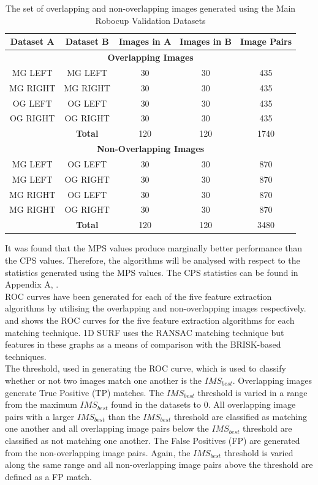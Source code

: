 \documentclass[11pt]{report}
\begin{document}
\begin{table}
\centering
\caption{The set of overlapping and non-overlapping images generated using
the Main Robocup Validation Datasets}
\begin{tabular}{|c|c|c|c|c|}
\hline 
\textbf{Dataset A} & \textbf{Dataset B} & \textbf{Images in A} & \textbf{Images in B} & \textbf{Image Pairs}\tabularnewline
\hline 
\hline 
\multicolumn{5}{|c|}{\textbf{Overlapping Images}}\tabularnewline
\hline 
MG LEFT & MG LEFT & 30 & 30 & 435\tabularnewline
\hline 
MG RIGHT & MG RIGHT & 30 & 30 & 435\tabularnewline
\hline 
OG LEFT & OG LEFT & 30 & 30 & 435\tabularnewline
\hline 
OG RIGHT & OG RIGHT & 30 & 30 & 435\tabularnewline
\hline 
 & \textbf{Total} & 120 & 120 & 1740\tabularnewline
\hline 
\multicolumn{5}{|c|}{\textbf{Non-Overlapping Images}}\tabularnewline
\hline 
MG LEFT & OG LEFT & 30 & 30 & 870\tabularnewline
\hline 
MG LEFT & OG RIGHT & 30 & 30 & 870\tabularnewline
\hline 
MG RIGHT & OG LEFT & 30 & 30 & 870\tabularnewline
\hline 
MG RIGHT & OG RIGHT & 30 & 30 & 870\tabularnewline
\hline 
 & \textbf{Total} & 120 & 120 & 3480\tabularnewline
\hline 
\end{tabular}
\label{tab:mrtd}
\end{table}

It was found that the MPS values produce marginally better performance than the CPS values. Therefore, the algorithms will be analysed with respect to the statistics generated using the MPS values. The CPS statistics can be found in Appendix A, .\\

ROC curves have been generated for each of the five feature extraction algorithms by utilising the overlapping and non-overlapping images respectively.  and  shows the ROC curves for the five feature extraction algorithms for each matching technique. 1D SURF uses the RANSAC matching technique but features in these graphs as a means of comparison with the BRISK-based techniques.\\

The threshold, used in generating the ROC curve, which is used to classify whether or not two images match one another is the $IMS_{best}$. Overlapping images generate True Positive (TP) matches. The $IMS_{best}$ threshold is varied in a range from the maximum $IMS_{best}$ found in the datasets to $0$.  All overlapping image pairs with a larger $IMS_{best}$ than the $IMS_{best}$ threshold are classified as matching one another and all overlapping image pairs below the $IMS_{best}$ threshold are classified as not matching one another. The False Positives (FP) are generated from the non-overlapping image pairs. Again, the $IMS_{best}$ threshold is varied along the same range and all non-overlapping image pairs above the threshold are defined as a FP match. \\
\end{document}
